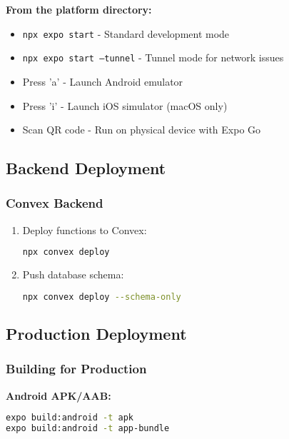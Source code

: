 \documentclass[11pt,a4paper]{article}
\begin{document}
\begin{tcolorbox}[colback=lightgray,colframe=black,title=\textbf{Running Options}]
\textbf{From the platform directory:}
\begin{itemize}[leftmargin=*]
    \item \texttt{npx expo start} - Standard development mode
    \item \texttt{npx expo start --tunnel} - Tunnel mode for network issues
    \item Press 'a' - Launch Android emulator
    \item Press 'i' - Launch iOS simulator (macOS only)
    \item Scan QR code - Run on physical device with Expo Go
\end{itemize}
\end{tcolorbox}

\subsection{Backend Deployment}

\subsubsection{Convex Backend}

\begin{enumerate}
    \item Deploy functions to Convex:
    \begin{lstlisting}[language=bash]
npx convex deploy
    \end{lstlisting}
    
    \item Push database schema:
    \begin{lstlisting}[language=bash]
npx convex deploy --schema-only
    \end{lstlisting}
\end{enumerate}

\subsection{Production Deployment}

\subsubsection{Building for Production}

\textbf{Android APK/AAB:}
\begin{lstlisting}[language=bash]
expo build:android -t apk
expo build:android -t app-bundle
\end{lstlisting}
\end{document}
